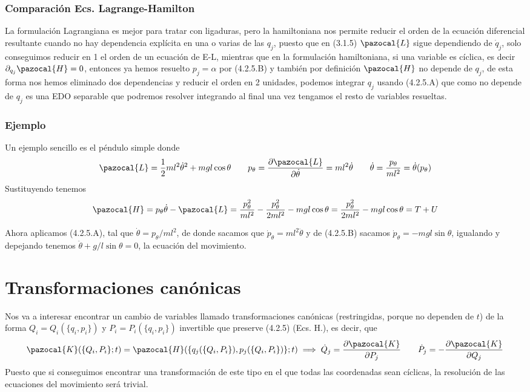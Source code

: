 \subsubsection{Comparación Ecs. Lagrange-Hamilton}
La formulación Lagrangiana es mejor para tratar con ligaduras, pero la hamiltoniana nos permite reducir el orden de la ecuación diferencial resultante cuando no hay dependencia explícita en una o varias de las $q_j$, puesto que en (3.1.5) $  \pazocal{L}$ sigue dependiendo de $\dot{q}_j$, solo conseguimos reducir en 1 el orden de un ecuación de E-L, mientras que en la formulación hamiltoniana, si una variable es cíclica, es decir $\partial_{q_j}\pazocal{H}=0$, entonces ya hemos resuelto $p_j=\alpha$ por (4.2.5.B) y también por definición $\pazocal{H}$ no depende de $q_j$, de esta forma nos hemos eliminado dos dependencias y reducir el orden en 2 unidades, podemos integrar $q_j$ usando (4.2.5.A) que como no depende de $q_j$ es una EDO separable que podremos resolver integrando al final una vez tengamos el resto de variables resueltas. 
\subsubsection{Ejemplo}
Un ejemplo sencillo es el péndulo simple donde 
\[\pazocal{L}=\frac{1}{2}ml^2\dot{\theta}^2+mgl\cos{\theta} \ \ \ \ \ \ p_\theta = \frac{\partial \pazocal{L}}{\partial \dot{\theta}}=ml^2\dot{\theta} \ \ \ \ \ \ \dot{\theta}=\frac{p_\theta}{ml^2}=\dot{\theta}(p_\theta)\]
Sustituyendo tenemos 
\[\pazocal{H}=p_\theta \dot{\theta} -\pazocal{L}=\frac{p_\theta^2}{ml^2} - \frac{p_\theta^2}{2ml^2}-mgl\cos\theta = \frac{p_\theta^2}{2ml^2}-mgl\cos\theta = T+U\]

Ahora aplicamos (4.2.5.A), tal que $\dot{\theta} = p_\theta/ml^2$, de donde sacamos que $\dot{p}_\theta=ml^2 \ddot{\theta}$ y de (4.2.5.B) sacamos $\dot{p}_\theta=-mgl\sin\theta$, igualando y depejando tenemos $\ddot{\theta} + g/l \sin\theta = 0$, la ecuación del movimiento.
\section{Transformaciones canónicas} 
Nos va a interesar encontrar un cambio de variables llamado transformaciones canónicas (restringidas, porque no dependen de $t$) de la forma $Q_i=Q_i(\{q_i,p_i\})$ y $P_i=P_i(\{q_i,p_i\})$ invertible que preserve (4.2.5) (Ecs. H.), es decir, que
\begin{equation} \label{4.2.7}
    \pazocal{K} (\{Q_i,P_i\};t) = \pazocal{H} (\{q_j(\{Q_i,P_i\}),p_j(\{Q_i,P_i\})\};t) \implies \dot{Q}_j = \frac{\partial \pazocal{K}}{\partial P_j} \ \ \ \ \ \ \dot{P}_j= -\frac{\partial \pazocal{K}}{\partial Q_j}
\end{equation} 
Puesto que si conseguimos encontrar una transformación de este tipo en el que todas las coordenadas sean cíclicas, la resolución de las ecuaciones del movimiento será trivial.
